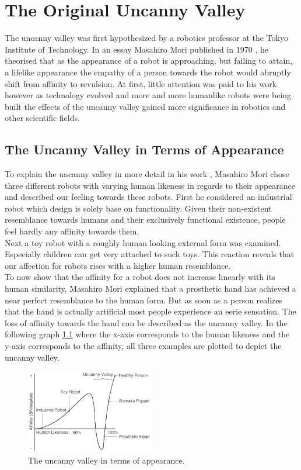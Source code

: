 \chapter{The Original Uncanny Valley}
The uncanny valley was first hypothesized by a robotics professor at the Tokyo Institute of Technology. In an essay Masahiro Mori published in 1970 \cite{original_masahiro}, he theorised that as the appearance of a robot is approaching, but failing to attain, a lifelike appearance the empathy of a person towards the robot would abruptly shift from affinity to revulsion.
At first, little attention was paid to his work however as technology evolved and more and more humanlike robots were being built the effects of the uncanny valley gained more significance in robotics and other scientific fields. 

\section{The Uncanny Valley in Terms of Appearance}
To explain the uncanny valley in more detail in his work \cite{original_masahiro}, Masahiro Mori chose three different robots with varying human likeness in regards to their appearance and described our feeling towards these robots. First he considered an industrial robot which design is solely base on functionality. Given their non-existent resemblance towards humans and their exclusively functional existence, people feel hardly any affinity towards them.\\
Next a toy robot with a roughly human looking external form was examined. Especially children can get very attached to such toys. This reaction reveals that our affection for robots rises with a higher human resemblance.\\
To now show that the affinity for a robot does not increase linearly with its human similarity, Masahiro Mori explained that a prosthetic hand has achieved a near perfect resemblance to the human form. But as soon as a person realizes that the hand is actually artificial most people experience an eerie sensation. The loss of affinity towards the hand can be described as the uncanny valley.
In the following graph \ref{fig:uv_appearance} where the x-axis corresponds to the human likeness and the y-axis corresponds to the affinity, all three examples are plotted to depict the uncanny valley. 
\begin{figure} %
    \centering
    \includegraphics[width=0.5\textwidth]{graphics/uv_appearance.png}
    \caption{The uncanny valley in terms of appearance.}
    \label{fig:uv_appearance}
\end{figure}
